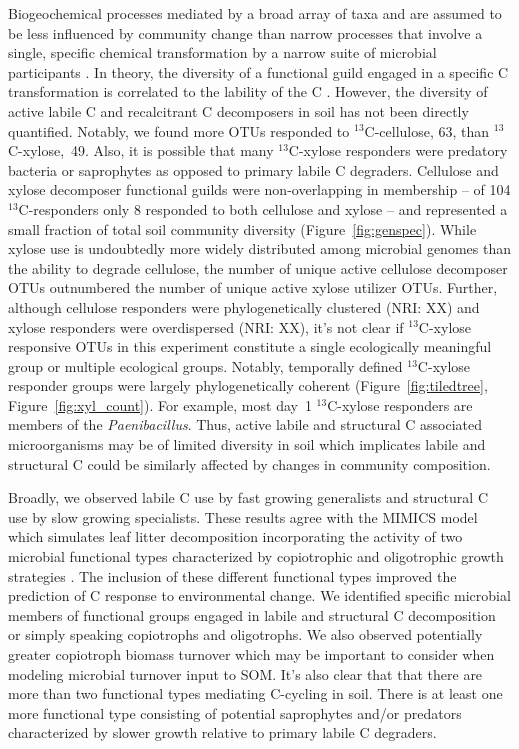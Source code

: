 Biogeochemical processes mediated by a broad array of taxa and are assumed to
be less influenced by community change than narrow processes that involve
a single, specific chemical transformation by a narrow suite of microbial
participants \citep{Schimel_1995,McGuire2010}. In theory, the diversity of
a functional guild engaged in a specific C transformation is correlated to the
lability of the C \citep{McGuire2010}. However, the diversity of active
labile C and recalcitrant C decomposers in soil has not been directly
quantified. Notably, we found more OTUs responded to $^{13}$C-cellulose, 63,
than $^{13}$C-xylose,~49. Also, it is possible that many $^{13}$C-xylose
responders were predatory bacteria or saprophytes as opposed to primary labile
C degraders. Cellulose and xylose decomposer functional guilds were
non-overlapping in membership -- of 104 $^{13}$C-responders only 8 responded to
both cellulose and xylose -- and represented a small fraction of total soil
community diversity (Figure~\ref{fig:genspec}). While xylose use is undoubtedly
more widely distributed among microbial genomes than the ability to degrade
cellulose, the number of unique active cellulose decomposer OTUs outnumbered
the number of unique active xylose utilizer OTUs. Further, although cellulose
responders were phylogenetically clustered (NRI: XX) and xylose responders were
overdispersed (NRI: XX), it's not clear if $^{13}$C-xylose responsive OTUs in
this experiment constitute a single ecologically meaningful group or multiple
ecological groups. Notably, temporally defined $^{13}$C-xylose responder groups
were largely phylogenetically coherent (Figure~\ref{fig:tiledtree},
Figure~\ref{fig:xyl_count}). For example, most day~1 $^{13}$C-xylose responders
are members of the \textit{Paenibacillus}. Thus, active labile and structural
C associated microorganisms may be of limited diversity in soil which
implicates labile and structural C could be similarly affected by changes in
community composition. 

Broadly, we observed labile C use by fast growing generalists and structural
C use by slow growing specialists. These results agree with the MIMICS model
which simulates leaf litter decomposition incorporating the activity of two
microbial functional types characterized by copiotrophic and
oligotrophic growth strategies \citep{wieder_2014a}. The inclusion of these
different functional types improved the prediction of C response to
environmental change. We identified specific microbial members of functional
groups engaged in labile and structural C decomposition or simply speaking
copiotrophs and oligotrophs. We also observed potentially greater copiotroph
biomass turnover which may be important to consider when modeling microbial
turnover input to SOM. It's also clear that that there are more than two
functional types mediating C-cycling in soil. There is at least one more
functional type consisting of potential saprophytes and/or predators
characterized by slower growth relative to primary labile C degraders. 

